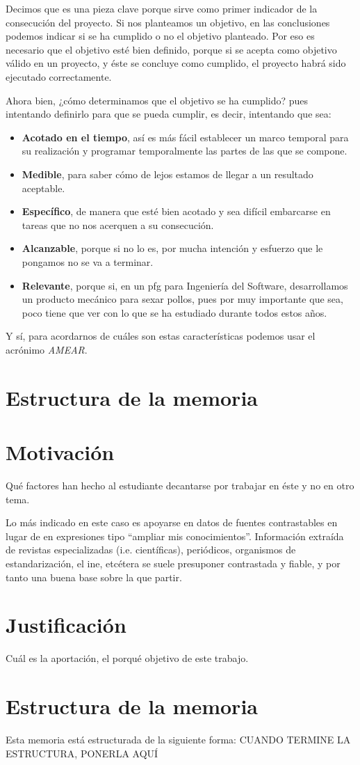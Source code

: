 Decimos que es una pieza clave porque sirve como primer indicador de la consecución del proyecto. Si nos planteamos un objetivo, en las conclusiones podemos indicar si se ha cumplido o no el objetivo planteado. Por eso es necesario que el objetivo esté bien definido, porque si se acepta como objetivo válido en un proyecto, y éste se concluye como cumplido, el proyecto habrá sido ejecutado correctamente.

Ahora bien, ¿cómo determinamos que el objetivo se ha cumplido? pues intentando definirlo para que se pueda cumplir, es decir, intentando que sea:

\begin{itemize}
    \item \textbf{Acotado en el tiempo}, así es más fácil establecer un marco temporal para su realización y programar temporalmente las partes de las que se compone.
    \item \textbf{Medible}, para saber cómo de lejos estamos de llegar a un resultado aceptable.
    \item \textbf{Específico}, de manera que esté bien acotado y sea difícil embarcarse en tareas que no nos acerquen a su consecución.
    \item \textbf{Alcanzable}, porque si no lo es, por mucha intención y esfuerzo que le pongamos no se va a terminar.
    \item \textbf{Relevante}, porque si, en un \gls{pfg} para Ingeniería del Software, desarrollamos un producto mecánico para sexar pollos, pues por muy importante que sea, poco tiene que ver con lo que se ha estudiado durante todos estos años.
\end{itemize}

Y sí, para acordarnos de cuáles son estas características podemos usar el acrónimo \textit{AMEAR}.
\section{Estructura de la memoria}

\section{Motivación}

Qué factores han hecho al estudiante decantarse por trabajar en éste y no en otro tema.

Lo más indicado en este caso es apoyarse en datos de fuentes contrastables en lugar de en expresiones tipo ``ampliar mis conocimientos''. Información extraída de revistas especializadas (i.e. científicas), periódicos, organismos de estandarización, el \gls{ine}, etcétera se suele presuponer contrastada y fiable, y por tanto una buena base sobre la que partir.

\section{Justificación}

Cuál es la aportación, el porqué objetivo de este trabajo.

\section{Estructura de la memoria}

Esta memoria está estructurada de la siguiente forma: CUANDO TERMINE LA ESTRUCTURA, PONERLA AQUÍ